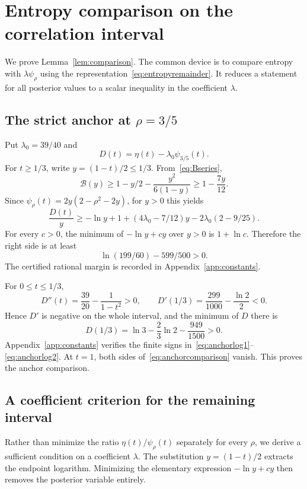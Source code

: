\section{Entropy comparison on the correlation interval}\label{app:comparisons}
We prove Lemma~\ref{lem:comparison}. The common device is to compare entropy with $\lambda\psi_\rho$ using the representation~\eqref{eq:entropyremainder}. It reduces a statement for all posterior values to a scalar inequality in the coefficient $\lambda$.

\subsection{The strict anchor at $\rho=3/5$}\label{app:anchor}
Put $\lambda_0=39/40$ and
\[
D(t)=\eta(t)-\lambda_0\psi_{3/5}(t).
\]
For $t\ge1/3$, write $y=(1-t)/2\le1/3$. From~\eqref{eq:Bseries},
\[
\mathcal B(y)\ge1-y/2-\frac{y^2}{6(1-y)}\ge1-\frac{7y}{12}.
\]
Since $\psi_\rho(t)=2y(2-\rho^2-2y)$, for $y>0$ this yields
\[
\frac{D(t)}y
\ge-\ln y+1+(4\lambda_0-7/12)y-2\lambda_0(2-9/25).
\]
For every $c>0$, the minimum of $-\ln y+cy$ over $y>0$ is $1+\ln c$. Therefore the right side is at least
\begin{equation}\label{eq:anchorlog1}
\ln(199/60)-599/500>0.
\end{equation}
The certified rational margin is recorded in Appendix~\ref{app:constants}.

For $0\le t\le1/3$,
\[
D''(t)=\frac{39}{20}-\frac1{1-t^2}>0,
\qquad D'(1/3)=\frac{299}{1000}-\frac{\ln2}{2}<0.
\]
Hence $D'$ is negative on the whole interval, and the minimum of $D$ there is
\begin{equation}\label{eq:anchorlog2}
D(1/3)=\ln3-\frac23\ln2-\frac{949}{1500}>0.
\end{equation}
Appendix~\ref{app:constants} verifies the finite signs in~\eqref{eq:anchorlog1}--\eqref{eq:anchorlog2}. At $t=1$, both sides of~\eqref{eq:anchorcomparison} vanish. This proves the anchor comparison.

\subsection{A coefficient criterion for the remaining interval}
Rather than minimize the ratio $\eta(t)/\psi_\rho(t)$ separately for every $\rho$, we derive a sufficient condition on a coefficient $\lambda$. The substitution $y=(1-t)/2$ extracts the endpoint logarithm. Minimizing the elementary expression $-\ln y+cy$ then removes the posterior variable entirely.

